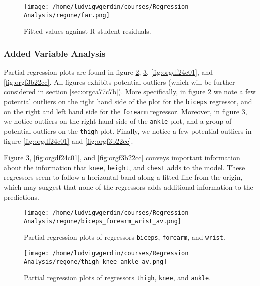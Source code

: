 \documentclass[11pt]{article}
\begin{document}
\begin{figure}[htbp]
\centering
\texttt{[image: /home/ludvigwgerdin/courses/Regression Analysis/regone/far.png]}
\caption{\label{fig:org0fa4440}
Fitted values against R-student residuals.}
\end{figure}

\subsubsection{Added Variable Analysis}
\label{sec:org556683f}

Partial regression plots are found in figure \ref{fig:orgef9e201}, \ref{fig:org59389c7},
\ref{fig:orgdf24c01}, and \ref{fig:orgf3b22cc}. All figures exhibits potential outliers 
(which will be further considered in section \ref{sec:orgca77c7b}).
More specifically, in figure \ref{fig:orgef9e201} we note a 
few potential outliers on the right hand side of the plot for the \texttt{biceps} regressor, and on the
right and left hand side for the \texttt{forearm} regressor. Moreover, in figure \ref{fig:org59389c7}, we 
notice outliers on the right hand side of the \texttt{ankle} plot, and a group of potential outliers on the
\texttt{thigh} plot. Finally, we notice a few potential outliers in figure \ref{fig:orgdf24c01} and 
\ref{fig:orgf3b22cc}.

Figure \ref{fig:org59389c7}, \ref{fig:orgdf24c01}, and \ref{fig:orgf3b22cc} 
conveys important information about the information that \texttt{knee}, \texttt{height}, and
\texttt{chest} adds to the model. These regressors seem to follow a horizontal band along a fitted 
line from the origin, which may suggest that none of the regressors adds additional information 
to the predictions.

\begin{figure}[htbp]
\centering
\texttt{[image: /home/ludvigwgerdin/courses/Regression Analysis/regone/biceps\_forearm\_wrist\_av.png]}
\caption{\label{fig:orgef9e201}
Partial regression plots of regressors \texttt{biceps}, \texttt{forearm}, and \texttt{wrist}.}
\end{figure}   

\begin{figure}[htbp]
\centering
\texttt{[image: /home/ludvigwgerdin/courses/Regression Analysis/regone/thigh\_knee\_ankle\_av.png]}
\caption{\label{fig:org59389c7}
Partial regression plots of regressors \texttt{thigh}, \texttt{knee}, and \texttt{ankle}.}
\end{figure}
\end{document}
